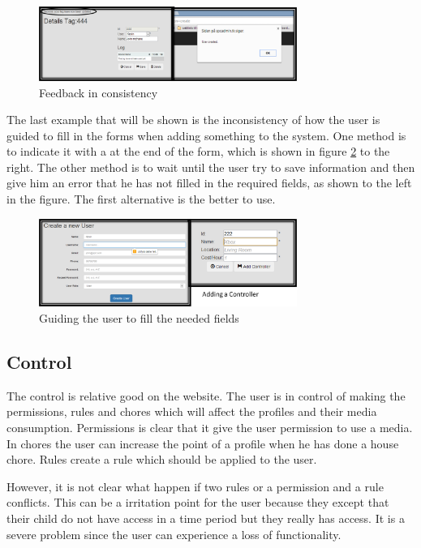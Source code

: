 \begin{figure}
	\centering
		\includegraphics[width=0.75\textwidth]{images/afteraddConsistency.png}
	\caption{Feedback in consistency}
	\label{fig:afteraddConsistency}
\end{figure}

The last example that will be shown is the inconsistency of how the user is guided to fill in the forms when adding something to the system. One method is to indicate it with a \* at the end of the form, which is shown in figure \ref{fig:consistencyAddControllerUser} to the right. The other method is to wait until the user try to save information and then give him an error that he has not filled in the required fields, as shown to the left in the figure. The first alternative is the better to use.

\begin{figure}
	\centering
		\includegraphics[width=0.75\textwidth]{images/consistencyAddControllerUser.png}
	\caption{Guiding the user to fill the needed fields}
	\label{fig:consistencyAddControllerUser}
\end{figure}

 
\subsection{Control}
The control is relative good on the website. The user is in control of making the permissions, rules and chores which will affect the profiles and their media consumption. Permissions is clear that it give the user permission to use a media. In chores the user can increase the point of a profile when he has done a house chore. Rules create a rule which should be applied to the user. 

However, it is not clear what happen if two rules or a permission and a rule conflicts. This can be a irritation point for the user because they except that their child do not have access in a time period but they really has access. It is a severe problem since the user can experience a loss of functionality.     

